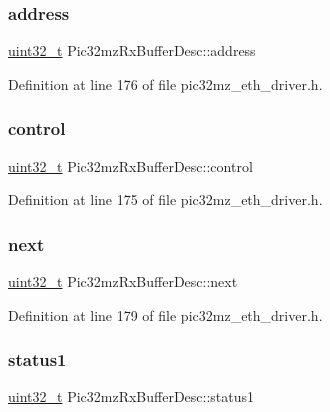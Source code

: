 \subsubsection{\texorpdfstring{address}{address}}
{\footnotesize\ttfamily \hyperlink{stdint_8h_a435d1572bf3f880d55459d9805097f62}{uint32\+\_\+t} Pic32mz\+Rx\+Buffer\+Desc\+::address}



Definition at line 176 of file pic32mz\+\_\+eth\+\_\+driver.\+h.

\mbox{\label{structPic32mzRxBufferDesc_a6c5d412967f5321269566980ba585303}} 
\subsubsection{\texorpdfstring{control}{control}}
{\footnotesize\ttfamily \hyperlink{stdint_8h_a435d1572bf3f880d55459d9805097f62}{uint32\+\_\+t} Pic32mz\+Rx\+Buffer\+Desc\+::control}



Definition at line 175 of file pic32mz\+\_\+eth\+\_\+driver.\+h.

\mbox{\label{structPic32mzRxBufferDesc_a985d45d76d242c516732f87206bac3d3}} 
\subsubsection{\texorpdfstring{next}{next}}
{\footnotesize\ttfamily \hyperlink{stdint_8h_a435d1572bf3f880d55459d9805097f62}{uint32\+\_\+t} Pic32mz\+Rx\+Buffer\+Desc\+::next}



Definition at line 179 of file pic32mz\+\_\+eth\+\_\+driver.\+h.

\mbox{\label{structPic32mzRxBufferDesc_a2f6dacf436998ffbd815f2cb4366457e}} 
\subsubsection{\texorpdfstring{status1}{status1}}
{\footnotesize\ttfamily \hyperlink{stdint_8h_a435d1572bf3f880d55459d9805097f62}{uint32\+\_\+t} Pic32mz\+Rx\+Buffer\+Desc\+::status1}



